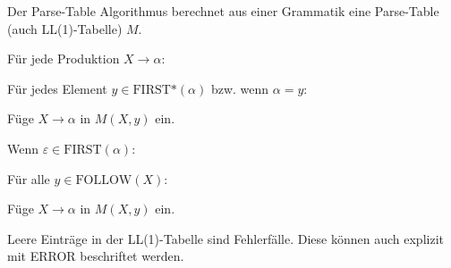 \begin{algo}
Der Parse-Table Algorithmus berechnet aus einer Grammatik eine Parse-Table (auch LL(1)-Tabelle) $M$.
\begin{\whichenum}
\item Für jede Produktion $X \to \alpha$:
\begin{\whichenum}
\item Für jedes Element $y \in \text{FIRST*}(\alpha)$ bzw. wenn $\alpha = y$:
\begin{\whichenum}
\item Füge $X \to \alpha$ in $M(X,y)$ ein.
\end{\whichenum}
\item Wenn $\varepsilon \in \text{FIRST}(\alpha)$:
\begin{\whichenum}
\item Für alle $y \in \text{FOLLOW}(X)$:
\begin{\whichenum}
\item Füge $X \to \alpha$ in $M(X,y)$ ein.
\end{\whichenum}
\end{\whichenum}
\end{\whichenum}
\end{\whichenum}
Leere Einträge in der LL(1)-Tabelle sind Fehlerfälle. Diese können auch explizit mit ERROR beschriftet werden.
\end{algo}

